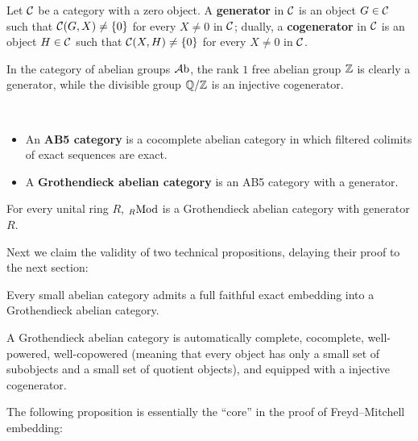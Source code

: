 \documentclass[twoside]{article}
\begin{document}
\begin{defn}
Let ${\mathcal{C}}$ be a category with a zero object. A \textbf{generator} in ${\mathcal{C}}$ is an object $G \in {\mathcal{C}}$ such that ${\mathcal{C}}(G, X) \neq \{0\}$ for every $X \neq 0$ in ${\mathcal{C}}$; dually, a \textbf{cogenerator} in ${\mathcal{C}}$ is an object $H \in {\mathcal{C}}$ such that ${\mathcal{C}}(X, H)\neq \{0\}$ for every $X \neq 0$ in ${\mathcal{C}}$.
\end{defn}

\begin{expl}
In the category of abelian groups $\mathcal{A}\mathrm{b}$, the rank $1$ free abelian group $\mathbb{Z}$ is clearly a generator, while the divisible group $\mathbb{Q}/\mathbb{Z}$ is an injective cogenerator.
\end{expl}

\begin{defn}
\ 
\begin{itemize}
\item An \textbf{AB5 category} is a cocomplete abelian category in which filtered colimits  of exact sequences are exact.
\item A \textbf{Grothendieck abelian category} is an AB5 category with a generator.
\end{itemize}
\end{defn}

\begin{expl}
For every unital ring $R$, ${}_R\mathrm{Mod}$ is a Grothendieck abelian category with generator $R$.
\end{expl}

Next we claim the validity of two technical propositions, delaying their proof to the next section:

\begin{prop}\label{preone}
Every small abelian category admits a full faithful exact embedding into a Grothendieck abelian category.
\end{prop}

\begin{prop}\label{pretwo}
A Grothendieck abelian category is automatically complete, cocomplete, well-powered, well-copowered (meaning that every object has only a small set of subobjects and a small set of quotient objects), and equipped with a injective cogenerator.
\end{prop}

The following proposition is essentially the ``core'' in the proof of Freyd--Mitchell embedding:
\end{document}
